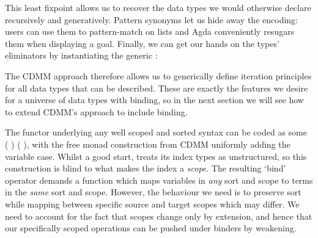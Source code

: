 \begin{center}
\end{center}

This least fixpoint allows us to recover the data types we would
otherwise declare recursively and generatively. Pattern synonyms let us hide away the
encoding: users can use them to pattern-match on lists and Agda
conveniently resugars them when displaying a goal. Finally, we can get
our hands on the types' eliminators by instantiating the generic
:

\begin{center}
\begin{minipage}[t]{0.45\textwidth}
\end{minipage}
\begin{minipage}[t]{0.45\textwidth}
\end{minipage}
\end{center}

The CDMM approach therefore allows us to generically define iteration principles
for all data types that can be described. These are exactly the features we desire
for a universe of data types with binding, so in the next section we will see how
to extend CDMM's approach to include binding.

The functor underlying any well scoped and sorted syntax can be coded as some
{ (   ) (   )},
 with the
free monad construction from CDMM uniformly adding the variable case. Whilst a
good start,  treats its index types as unstructured, so this construction
is blind to what makes the { } index a \emph{scope}.
The resulting
`bind' operator demands a function which maps variables in \emph{any} sort and
scope to terms in the \emph{same} sort and scope. However, the behaviour we need
is to preserve sort while mapping between specific source and target scopes which
may differ. We need to account for the fact that scopes change only by extension,
and hence that our specifically scoped operations can be pushed under binders by
weakening.




